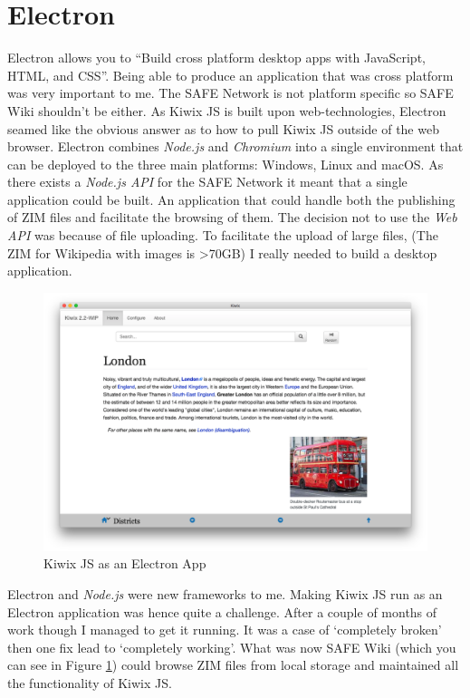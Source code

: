 \section{Electron}

Electron allows you to ``Build cross platform desktop apps with JavaScript, HTML, and CSS''. Being able to produce an application that was cross platform was very important to me. The SAFE Network is not platform specific so SAFE Wiki shouldn't be either. As Kiwix JS is built upon web-technologies, Electron seamed like the obvious answer as to how to pull Kiwix JS outside of the web browser. Electron combines \textit{Node.js} and \textit{Chromium} into a single environment that can be deployed to the three main platforms: Windows, Linux and macOS. As there exists a \textit{Node.js API} for the SAFE Network it meant that a single application could be built. An application that could handle both the publishing of ZIM files and facilitate the browsing of them. The decision not to use the \textit{Web API} was because of file uploading. To facilitate the upload of large files, (The ZIM for Wikipedia with images is \textgreater 70GB) I really needed to build a desktop application.

\begin{figure}[h]
	\begin{center}
		\includegraphics[width=\textwidth]{images/kiwix-js-electron}
		\caption{Kiwix JS as an Electron App}
		\label{fig:kiwix-js-electron}
	\end{center}
\end{figure}

Electron and \textit{Node.js} were new frameworks to me. Making Kiwix JS run as an Electron application was hence quite a challenge. After a couple of months of work though I managed to get it running. It was a case of `completely broken' then one fix lead to `completely working'. What was now SAFE Wiki (which you can see in Figure \ref{fig:kiwix-js-electron}) could browse ZIM files from local storage and maintained all the functionality of Kiwix JS.

